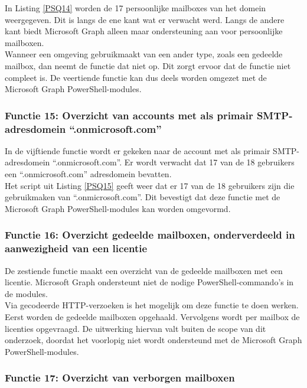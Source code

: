 In Listing \ref{PSQ14} worden de 17 persoonlijke mailboxes van het domein weergegeven. Dit is langs de ene kant wat er verwacht werd. Langs de andere kant biedt Microsoft Graph alleen maar ondersteuning aan voor persoonlijke mailboxen. \\

Wanneer een omgeving gebruikmaakt van een ander type, zoals een gedeelde mailbox, dan neemt de functie dat niet op. Dit zorgt ervoor dat de functie niet compleet is. De veertiende functie kan dus deels worden omgezet met de Microsoft Graph PowerShell-modules.

\subsubsection{Functie 15: Overzicht van accounts met als primair SMTP-adresdomein “.onmicrosoft.com”}

In de vijftiende functie wordt er gekeken naar de account met als primair \Ac{SMTP}-adresdomein “.onmicrosoft.com”. Er wordt verwacht dat 17 van de 18 gebruikers een “.onmicrosoft.com” adresdomein bevatten. \\

Het script uit Listing \ref{PSQ15} geeft weer dat er 17 van de 18 gebruikers zijn die gebruikmaken van “.onmicrosoft.com”. Dit bevestigt dat deze functie met de Microsoft Graph PowerShell-modules kan worden omgevormd.

\subsubsection{Functie 16: Overzicht gedeelde mailboxen, onderverdeeld in aanwezigheid van een licentie}

De zestiende functie maakt een overzicht van de gedeelde mailboxen met een licentie. Microsoft Graph ondersteunt niet de nodige PowerShell-commando's in de modules. \\

Via gecodeerde \ac{HTTP}-verzoeken is het mogelijk om deze functie te doen werken. Eerst worden de gedeelde mailboxen opgehaald. Vervolgens wordt per mailbox de licenties opgevraagd. De uitwerking hiervan valt buiten de scope van dit onderzoek, doordat het voorlopig niet wordt ondersteund met de Microsoft Graph PowerShell-modules.

\subsubsection{Functie 17: Overzicht van verborgen mailboxen}

